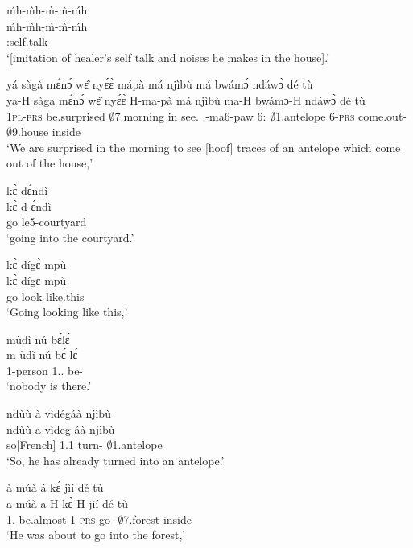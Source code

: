 \begin{exe}[(A34)]
\exA\label{a13}
  \glll   ḿh-m̀h-m̀-m̀-ḿh   \\
          ḿh-m̀h-m̀-m̀-ḿh   \\
          {\IDEO}:self.talk \\
    \trans `[imitation of healer's self talk and noises he makes in the house].'
 
\exA\label{a14} 
  \glll   yá sàgà mɛ́nɔ́ wɛ̂ nyɛ́ɛ̀ mápà má njìbù má bwámɔ́ ndáwɔ̀ dé tù \\
          ya-H sàga mɛ́nɔ́ wɛ̂ nyɛ́ɛ̀ H-ma-pà má njìbù ma-H bwámɔ-H ndáwɔ̀ dé tù     \\
        1\textsc{pl}-\textsc{prs} be.surprised $\emptyset$7.morning in see.{\SBJV}  {\OBJ}.{\LINK}-ma6-paw 6:{\ATT}  $\emptyset$1.antelope 6-\textsc{prs} come.out-{\R} $\emptyset$9.house {\LOC} inside  \\
    \trans `We are surprised in the morning to see [hoof] traces of an  antelope which come out of the house,'
 
\exA\label{a15}
  \glll   kɛ̀ dɛ́ndì \\
         kɛ̀ d-ɛ́ndì \\
          go le5-courtyard \\
    \trans `going into the courtyard.'
 
\exA\label{a16}
  \glll  kɛ̀ dígɛ̀ mpù \\
       kɛ̀ dígɛ mpù \\
          go look like.this       \\
    \trans `Going looking like this,'
 
\exA\label{a17}
  \glll  mùdì nú bɛ́lɛ́ \\
        m-ùdì nú bɛ́-lɛ́ \\
         {\N}1-person 1.{\DEM}.{\DIST} be-{\NEG} \\
    \trans `nobody is there.'
 
\exA\label{a18}
  \glll  ndùù à vìdégáà njìbù   \\
          ndùù a vìdeg-áà njìbù \\
           so[French]  1.{\PST}1 turn-{\PRF} $\emptyset$1.antelope    \\
    \trans `So, he has already turned into an antelope.'
 
\exA\label{a19}
  \glll  à múà á kɛ́ jìí dé tù    \\
          a múà a-H kɛ̀-H jìí dé tù       \\
       1.{\PST} be.almost 1-\textsc{prs} go-{\R} $\emptyset$7.forest {\LOC} inside \\
    \trans `He was about to go into the forest,'
 

\end{exe}
